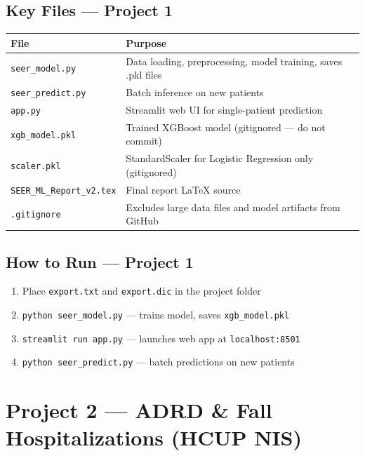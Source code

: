 \documentclass[11pt,letterpaper]{article}
\begin{document}
\subsection{Key Files — Project 1}

\begin{center}
\begin{tabular}{lp{9cm}}
\toprule
\textbf{File} & \textbf{Purpose} \\
\midrule
\texttt{seer\_model.py}       & Data loading, preprocessing, model training, saves .pkl files \\
\texttt{seer\_predict.py}     & Batch inference on new patients \\
\texttt{app.py}               & Streamlit web UI for single-patient prediction \\
\texttt{xgb\_model.pkl}       & Trained XGBoost model (gitignored — do not commit) \\
\texttt{scaler.pkl}           & StandardScaler for Logistic Regression only (gitignored) \\
\texttt{SEER\_ML\_Report\_v2.tex} & Final report LaTeX source \\
\texttt{.gitignore}           & Excludes large data files and model artifacts from GitHub \\
\bottomrule
\end{tabular}
\end{center}

\subsection{How to Run — Project 1}

\begin{enumerate}
  \item Place \texttt{export.txt} and \texttt{export.dic} in the project folder
  \item \texttt{python seer\_model.py} — trains model, saves \texttt{xgb\_model.pkl}
  \item \texttt{streamlit run app.py} — launches web app at \texttt{localhost:8501}
  \item \texttt{python seer\_predict.py} — batch predictions on new patients
\end{enumerate}

\newpage

\section{Project 2 — ADRD \& Fall Hospitalizations (HCUP NIS)}
\end{document}
